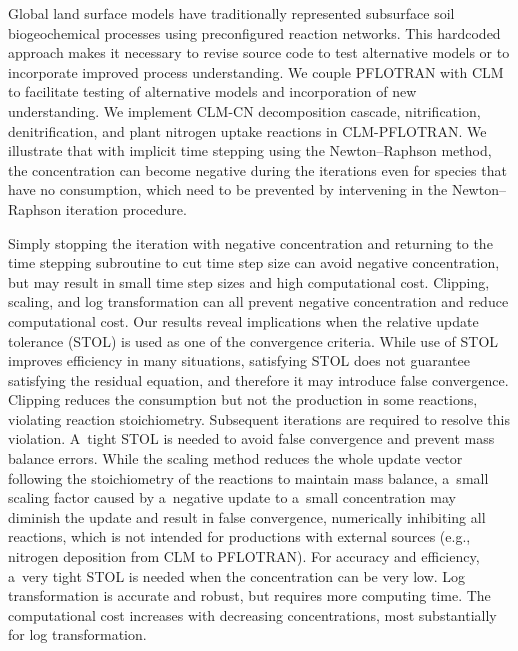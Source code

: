 \documentclass[gmdd, online, hvmath]{copernicus}
\begin{document}

      Global land surface models have traditionally represented subsurface
      soil biogeochemical processes using preconfigured reaction
      networks. This hardcoded approach makes it necessary to revise source
      code to test alternative models or to incorporate improved process
      understanding. We couple PFLOTRAN with CLM to facilitate testing of
      alternative models and incorporation of new understanding. We
      implement CLM-CN decomposition cascade, nitrification,
      denitrification, and plant nitrogen uptake reactions in
      CLM-PFLOTRAN. We illustrate that with implicit time stepping using the
      Newton--Raphson method, the concentration can become negative during
      the iterations even for species that have no consumption, which need
      to be prevented by intervening in the Newton--Raphson iteration
      procedure.

      Simply stopping the iteration with negative concentration and
      returning to the time stepping subroutine to cut time step size can
      avoid negative concentration, but may result in small time step sizes
      and high computational cost. Clipping, scaling, and log transformation
      can all prevent negative concentration and reduce computational
      cost. Our results reveal implications when the relative update
      tolerance (STOL) is used as one of the convergence criteria. While use
      of STOL improves efficiency in many situations, satisfying STOL does
      not guarantee satisfying the residual equation, and therefore it may
      introduce false convergence. Clipping reduces the consumption but not
      the production in some reactions, violating reaction
      stoichiometry. Subsequent iterations are required to resolve this
      violation. A~tight STOL is needed to avoid false convergence and
      prevent mass balance errors. While the scaling method reduces the
      whole update vector following the stoichiometry of the reactions to
      maintain mass balance, a~small scaling factor caused by a~negative
      update to a~small concentration may diminish the update and result in
      false convergence, numerically inhibiting all reactions, which is not
      intended for productions with external sources (e.g., nitrogen
      deposition from CLM to PFLOTRAN). For accuracy and efficiency, a~very
      tight STOL is needed when the concentration can be very low. Log
      transformation is accurate and robust, but requires more computing
      time. The computational cost increases with decreasing concentrations,
      most substantially for log transformation.
\end{document}
